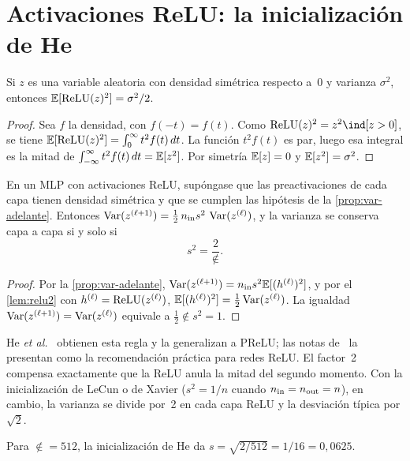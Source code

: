 \section{Activaciones ReLU: la inicialización de He}

\begin{lema}\label{lem:relu2}
Si $z$ es una variable aleatoria con densidad simétrica respecto a~0 y varianza $\sigma^{2}$, entonces $\mathbb{E}[\operatorname{ReLU}(z)^{2}]=\sigma^{2}/2$.
\end{lema}

\begin{proof}
Sea $f$ la densidad, con $f(-t)=f(t)$. Como $\ReLU(z)^{2}=z^{2}\ind[z>0]$, se tiene $\mathbb{E}[\operatorname{ReLU}(z)^{2}]=\int_0^{\infty}t^{2}f(t)\,dt$. La función $t^{2}f(t)$ es par, luego esa integral es la mitad de $\int_{-\infty}^{\infty}t^{2}f(t)\,dt=\mathbb{E}[z^{2}]$. Por simetría $\mathbb{E}[z]=0$ y $\mathbb{E}[z^{2}]=\sigma^{2}$.
\end{proof}

\begin{teorema}[Inicialización de He]\label{teo:he}
En un MLP con activaciones ReLU, supóngase que las preactivaciones de cada capa tienen densidad simétrica y que se cumplen las hipótesis de la \cref{prop:var-adelante}. Entonces $\operatorname{Var}(z^{(\ell+1)})=\tfrac12\,n_{\mathrm{in}} s^{2}\,\operatorname{Var}(z^{(\ell)})$, y la varianza se conserva capa a capa si y solo si
\[
s^{2}=\frac{2}{\nin}.
\]
\end{teorema}

\begin{proof}
Por la \cref{prop:var-adelante}, $\operatorname{Var}(z^{(\ell+1)})=n_{\mathrm{in}} s^{2}\mathbb{E}[(h^{(\ell)})^{2}]$, y por el \cref{lem:relu2} con $h^{(\ell)}=\operatorname{ReLU}(z^{(\ell)})$, $\mathbb{E}[(h^{(\ell)})^{2}]=\tfrac12\operatorname{Var}(z^{(\ell)})$. La igualdad $\operatorname{Var}(z^{(\ell+1)})=\operatorname{Var}(z^{(\ell)})$ equivale a $\tfrac12\nin s^{2}=1$.
\end{proof}

He \emph{et al.}~\cite{he} obtienen esta regla y la generalizan a PReLU; las notas de~\cite{cs231n} la presentan como la recomendación práctica para redes ReLU. El factor~2 compensa exactamente que la ReLU anula la mitad del segundo momento. Con la inicialización de LeCun o de Xavier ($s^{2}=1/n$ cuando $n_{\mathrm{in}}=n_{\mathrm{out}}=n$), en cambio, la varianza se divide por~2 en cada capa ReLU y la desviación típica por $\sqrt2$.

\begin{ejemplo}\label{ej:he}
Para $\nin=512$, la inicialización de He da $s=\sqrt{2/512}=1/16=0{,}0625$.
\end{ejemplo}

